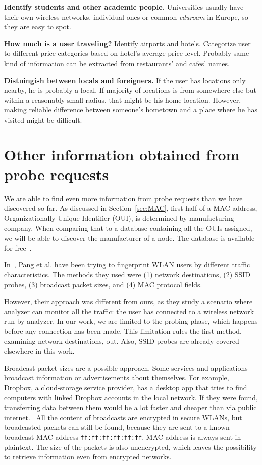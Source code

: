 \documentclass[12pt,a4paper,oneside,pdftex]{report}
\begin{document}
\textbf{Identify students and other academic people.} Universities usually have their own wireless networks, individual ones or common \emph{eduroam} in Europe, so they are easy to spot.

\textbf{How much is a user traveling?} Identify airports and hotels. Categorize user to different price categories based on hotel's average price level. Probably same kind of information can be extracted from restaurants' and cafes' names.

\textbf{Distuingish between locals and foreigners.} If the user has locations only nearby, he is probably a local. If majority of locations is from somewhere else but within a reasonably small radius, that might be his home location. However, making reliable difference between someone's hometown and a place where he has visited might be difficult.



\section{Other information obtained from probe requests}
\label{sec:other_info}

We are able to find even more information from probe requests than we have discovered so far. As discussed in Section~\ref{sec:MAC}, first half of a MAC address, Organizationally Unique Identifier (OUI), is determined by manufacturing company. When comparing that to a database containing all the OUIs assigned, we will be able to discover the manufacturer of a node. The database is available for free~\cite{oui_listing}.

In~\cite{pang2007802}, Pang et al. have been trying to fingerprint WLAN users by different traffic characteristics. The methods they used were (1) network destinations, (2) SSID probes, (3) broadcast packet sizes, and (4) MAC protocol fields. 

However, their approach was different from ours, as they study a scenario where analyzer can monitor all the traffic: the user has connected to a wireless network run by analyzer. In our work, we are limited to the probing phase, which happens before any connection has been made. This limitation rules the first method, examining network destinations, out. Also, SSID probes are already covered elsewhere in this work.

Broadcast packet sizes are a possible approach. Some services and applications broadcast information or advertisements about themselves. For example, Dropbox, a cloud-storage service provider, has a desktop app that tries to find computers with linked Dropbox accounts in the local network. If they were found, transferring data between them would be a lot faster and cheaper than via public internet.~\cite{dropboxlan} All the content of broadcasts are encrypted in secure WLANs, but broadcasted packets can still be found, because they are sent to a known broadcast MAC address \texttt{ff:ff:ff:ff:ff:ff}. MAC address is always sent in plaintext. The size of the packets is also unencrypted, which leaves the possibility to retrieve information even from encrypted networks.
\end{document}
